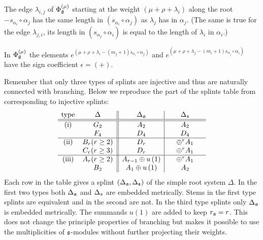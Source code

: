 \begin{Prop}
The edge $\lambda _{i,j}$ of $\Phi _{\mathfrak{g}}^{\left( \mu \right) }$
starting at the weight $\left( \mu +\rho +\lambda _{i}\right) $ along the
root $-s_{\alpha _{i}}\circ \alpha _{j}$ has the same length in $(s_{\alpha
_{i}}\circ \alpha _{j})$ as $\lambda _{j}$ has in $\alpha _{j}$. (The same
is true for the edge $\lambda _{j,i}$, its length in $(s_{\alpha _{j}}\circ
\alpha _{i})$ is equal to the length of $\lambda _{i}$ in $\alpha _{i}$.)
\label{diagram property}
\end{Prop}

In $\Phi _{\mathfrak{g}}^{\left( \mu \right) }$ the elements $e^{\left( \mu
+\rho +\lambda _{i}-(m_{j}+1)s_{\alpha _{i}}\circ \alpha _{j}\right) }$ and $%
e^{\left( \mu +\rho +\lambda _{j}-(m_{i}+1)s_{\alpha _{j}}\circ \alpha
_{i}\right) }$ have the sign coefficient  $\epsilon =(+)$.

Remember that only three types of splints are
injective and thus are naturally connected with branching. Below we
reproduce the part of the splints table from \cite{richter2008splints} corresponding to
injective splints:
\[
\begin{array}{cc||c|c}
\hbox{type} & \hspace{0.25in}\Delta \hspace{0.25in} & \hspace{0.25in}\Delta
_{\mathfrak{a}}\hspace{0.25in} & \hspace{0.25in}\Delta _{\frak{s}}\hspace{0.25in}
\\ \hline\hline
\hbox{(i)} & G_{2} & A_{2} & A_{2} \\
& F_{4} & D_{4} & D_{4} \\ \hline
\hbox{(ii)} & B_{r}(r\geq 2) & D_{r} & \oplus ^{r}A_{1} \\
& C_{r}(r\geq 3) & D_{r} & \oplus ^{r}A_{1} \\ \hline
\hbox{(iii)} & A_{r}(r\geq 2) & A_{r-1}\oplus u\left( 1\right)  & \oplus
^{r}A_{1} \\
& B_{2} & A_{1}\oplus u\left( 1\right)  & A_{2}
\end{array}
\]
Each row in the table gives a splint $(\Delta _{\mathfrak{a}},\Delta _{\frak{s}})
$ of the simple root system $\Delta $. In the first two types both $\Delta _{%
\af}$ and $\Delta _{\frak{s}}$ are embedded metrically. Stems in the
first type splints are equivalent and in the second are not. In the third
type splints only $\Delta _{\mathfrak{a}}$ is embedded metrically. The summands $%
u\left( 1\right) $ are added to keep $r_{\mathfrak{a}}=r$. This does not change
the principle properties of branching but makes it possible to use the
multiplicities of $\frak{s}$-modules without further projecting their
weights.

